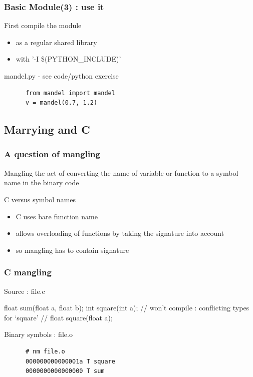 \begin{frame}[fragile]
  \frametitle{Basic Module(3) : use it}
  \begin{block}{First compile the module}
    \begin{itemize}
    \item as a regular shared library
    \item with '-I \$(PYTHON\_INCLUDE)'
    \end{itemize}
  \end{block}
  \begin{block}{mandel.py - see code/python exercise}
    \begin{verbatim}
      from mandel import mandel
      v = mandel(0.7, 1.2)
    \end{verbatim}
  \end{block}
\end{frame}


\subsection[C]{Marrying \cpp and C}

\begin{frame}[fragile]
  \frametitle{A question of mangling}
  \begin{block}{Mangling}
    the act of converting the name of variable or function to a symbol name in the binary code
  \end{block}
  \begin{block}{C versus \cpp symbol names}
    \begin{itemize}
    \item C uses bare function name
    \item \cpp allows overloading of functions by taking the signature into account
    \item so \cpp mangling has to contain signature
    \end{itemize}
  \end{block}
\end{frame}

\begin{frame}[fragile]
  \frametitle{C mangling}
  \begin{exampleblock}{Source : file.c}
    \begin{cppcode*}{}
      float sum(float a, float b);
      int square(int a);
      // won't compile : conflicting types for ‘square’
      // float square(float a);
    \end{cppcode*}
  \end{exampleblock}
  \begin{block}{Binary symbols : file.o}
    \begin{verbatim}
      # nm file.o
      000000000000001a T square
      0000000000000000 T sum
    \end{verbatim}
  \end{block}
\end{frame}

